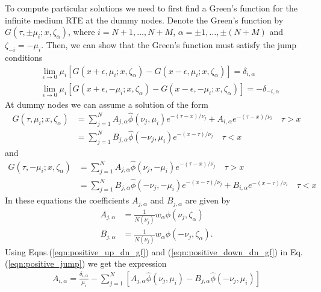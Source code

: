 \documentclass[11pt]{article}
\newcommand{\eqr}[1]{Eq.\thinspace(#1)}
\begin{document}
To compute particular solutions we need to first find a Green's
function for the infinite medium RTE at the dummy nodes. Denote the
Green's function by $G(\tau,\pm\mu_i; x,\zeta_\alpha)$, where
$i=N+1,\ldots,N+M$, $\alpha = \pm 1, \ldots, \pm (N+M)$ and
$\zeta_{-i} = -\mu_i$. Then, we can show that the Green's function
must satisfy the jump conditions
\begin{align}
  &\lim_{\epsilon \rightarrow 0} \mu_i
  \left[
    G(x+\epsilon, \mu_i; x, \zeta_\alpha)
    -
    G(x-\epsilon, \mu_i; x, \zeta_\alpha)
  \right] = \delta_{i,\alpha} \label{eqn:positive_jump} \\
  &\lim_{\epsilon \rightarrow 0} \mu_i
  \left[
    G(x+\epsilon, -\mu_i; x, \zeta_\alpha)
    -
    G(x-\epsilon, -\mu_i; x, \zeta_\alpha)
  \right] = -\delta_{-i,\alpha} \label{eqn:negative_jump}
\end{align}
At dummy nodes we can assume a solution of the form
\begin{align}
  G(\tau,\mu_i;x,\zeta_\alpha) 
  &= \sum_{j=1}^N 
  A_{j,\alpha} \hat{\phi}(\nu_j,\mu_i) e^{-(\tau-x)/\nu_j}
  + A_{i,\alpha} e^{-(\tau-x)/\nu_i}
  \quad \tau>x \label{eqn:positive_up_dn_gf}
  \\
  &= \sum_{j=1}^N 
  B_{j,\alpha} \hat{\phi}(-\nu_j,\mu_i) e^{-(x-\tau)/\nu_j}
  \quad \tau<x \label{eqn:positive_down_dn_gf}
\end{align}
and
\begin{align}
  G(\tau,-\mu_i;x,\zeta_\alpha) 
  &= \sum_{j=1}^N 
  A_{j,\alpha} \hat{\phi}(\nu_j,-\mu_i) e^{-(\tau-x)/\nu_j} 
  \quad \tau>x \label{eqn:negative_up_dn_gf}
  \\
  &= \sum_{j=1}^N 
  B_{j,\alpha} \hat{\phi}(-\nu_j,-\mu_i) e^{-(x-\tau)/\nu_j}
  + B_{i,\alpha} e^{-(x-\tau)/\nu_i}
  \quad \tau<x \label{eqn:negative_down_dn_gf}
\end{align}
In these equations the coefficients $A_{j,\alpha}$ and $B_{j,\alpha}$
are given by
\begin{align}
  A_{j,\alpha} &= \frac{1}{N(\nu_j)} w_\alpha \phi(\nu_j,\zeta_\alpha) \\
  B_{j,\alpha} &= \frac{1}{N(\nu_j)} w_\alpha \phi(-\nu_j,\zeta_\alpha).
\end{align}
Using Eqns.\thinspace(\ref{eqn:positive_up_dn_gf}) and
(\ref{eqn:positive_down_dn_gf}) in \eqr{\ref{eqn:positive_jump}} we
get the expression
\begin{align}
  A_{i,\alpha} =
  \frac{\delta_{i,\alpha}}{\mu_i}
  -
  \sum_{j=1}^N
  \left[
     A_{j,\alpha} \hat{\phi}(\nu_j,\mu_i)
    - B_{j,\alpha} \hat{\phi}(-\nu_j,\mu_i)
 \right]
\end{align}
\end{document}
